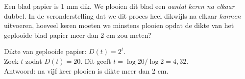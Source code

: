 %    
%
     
\begin{oef}
  Een blad papier is 1 mm dik. We plooien dit blad een
     \emph{aantal keren na elkaar} dubbel. In de veronderstelling dat
     we dit proces heel dikwijls na elkaar \emph{kunnen} uitvoeren,
     hoeveel keren moeten we minstens plooien opdat de dikte van
     het geplooide blad papier meer dan 2 cm zou meten?
     \begin{opl}
     Dikte van geplooide papier: $D(t)=2^t$.\\
     Zoek $t$ zodat $D(t)=20$. Dit geeft $t=\log20/\log 2=4,32$.\\
     Antwoord: na vijf keer plooien is dikte meer dan 2 cm.
     \end{opl}
\end{oef}

